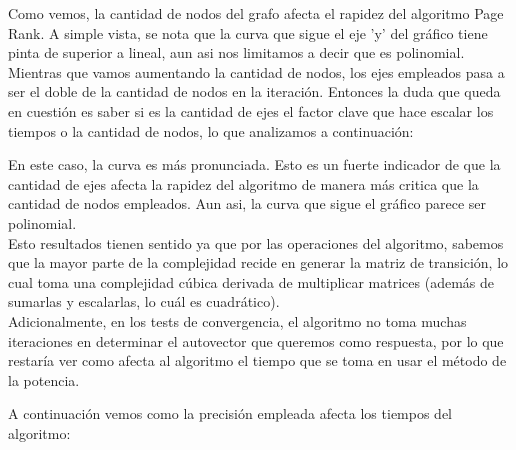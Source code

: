 Como vemos, la cantidad de nodos del grafo afecta el rapidez del algoritmo Page Rank. A simple vista, se nota que la curva que sigue el eje 'y' del gráfico tiene pinta de superior a lineal, aun asi nos limitamos a decir que es polinomial. Mientras que vamos aumentando la cantidad de nodos, los ejes empleados pasa a ser el doble de la cantidad de nodos en la iteración. Entonces la duda que queda en cuestión es saber si es la cantidad de ejes el factor clave que hace escalar los tiempos o la cantidad de nodos, lo que analizamos a continuación:

\begin{center}
\end{center}

En este caso, la curva es más pronunciada. Esto es un fuerte indicador de que la cantidad de ejes afecta la rapidez del algoritmo de manera más critica que la cantidad de nodos empleados. Aun asi, la curva que sigue el gráfico parece ser polinomial.\\

Esto resultados tienen sentido ya que por las operaciones del algoritmo, sabemos que la mayor parte de la complejidad recide en generar la matriz de transición, lo cual toma una complejidad cúbica derivada de multiplicar matrices (además de sumarlas y escalarlas, lo cuál es cuadrático). \\
Adicionalmente, en los tests de convergencia, el algoritmo no toma muchas iteraciones en determinar el autovector que queremos como respuesta, por lo que restaría ver como afecta al algoritmo el tiempo que se toma en usar el método de la potencia.

A continuación vemos como la precisión empleada afecta los tiempos del algoritmo:

\begin{center}
\end{center}


